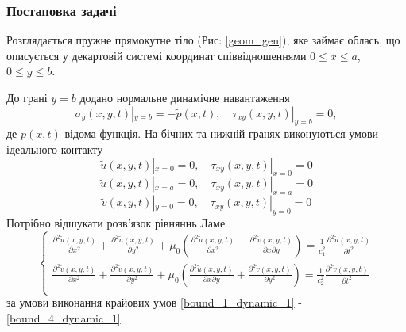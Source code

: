 \subsubsection{Постановка задачі}
Розглядається пружне прямокутне тіло (Рис: \ref{geom_gen}), яке займає облась,
що описується у декартовій системі координат співвідношеннями $0 \le x \le a$, $0 \le y \le b$.

До грані $y=b$ додано нормальне динамічне навантаження
\begin{equation}\label{bound_1_dynamic_1}
    \sigma_y(x, y, t) |_{y=b} = -\widetilde{p}(x, t), \quad  \tau_{xy}(x,y,t) |_{y=b} =0,
\end{equation}
де $p(x,t)$ відома функція.
На бічних та нижній гранях виконуються умови ідеального контакту
\begin{equation}\label{bound_2_dynamic_1}
    \widetilde{u}(x,y,t) |_{x=0} = 0, \quad \tau_{xy}(x,y,t) |_{x=0} =0
\end{equation}
\begin{equation}\label{bound_3_dynamic_1}
    \widetilde{u}(x,y,t) |_{x=a} = 0, \quad \tau_{xy}(x,y,t) |_{x=a} =0
\end{equation}
\begin{equation}\label{bound_4_dynamic_1}
    \widetilde{v}(x,y,t) |_{y=0} = 0, \quad \tau_{xy}(x,y,t) |_{y=0} =0
\end{equation}
Потрібно відшукати розв'язок рівняннь Ламе
\begin{equation}
    \begin{cases}
        \frac{\partial^2 \widetilde{u}(x,y,t)}{\partial x^2} + \frac{\partial^2 \widetilde{u}(x,y,t)}{\partial y^2} + \mu_0 (\frac{\partial^2 \widetilde{u}(x,y,t)}{\partial x^2} + \frac{\partial^2 \widetilde{v}(x,y,t)}{\partial x\partial y}) = \frac{1}{c_1^2} \frac{\partial^2 \widetilde{u}(x,y,t)}{\partial t^2} \\
        \frac{\partial^2 \widetilde{v}(x,y,t)}{\partial x^2} + \frac{\partial^2 \widetilde{v}(x,y,t)}{\partial y^2} + \mu_0 (\frac{\partial^2 \widetilde{u}(x,y,t)}{\partial x \partial y} + \frac{\partial^2 \widetilde{v}(x,y,t)}{\partial y^2}) = \frac{1}{c_2^2} \frac{\partial^2 \widetilde{v}(x,y,t)}{\partial t^2} \\
    \end{cases}
\end{equation}
за умови виконання крайових умов \eqref{bound_1_dynamic_1} - \eqref{bound_4_dynamic_1}.


